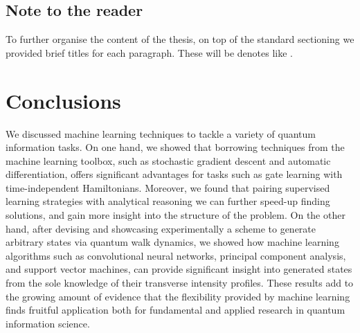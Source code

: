 \documentclass[12pt,twoside]{report}
\begin{document}
\section*{Note to the reader}
To further organise the content of the thesis, on top of the standard sectioning we provided brief titles for each paragraph. These will be denotes like .











\chapter{Conclusions}
We discussed machine learning techniques to tackle a variety of quantum information tasks.
On one hand, we showed that borrowing techniques from the machine learning toolbox, such as stochastic gradient descent and automatic differentiation, offers significant advantages for tasks such as gate learning with time-independent Hamiltonians.
Moreover, we found that pairing supervised learning strategies with analytical reasoning we can further speed-up finding solutions, and gain more insight into the structure of the problem.
On the other hand, after devising and showcasing experimentally a scheme to generate arbitrary states via quantum walk dynamics, we showed how machine learning algorithms such as convolutional neural networks, principal component analysis, and support vector machines, can provide significant insight into generated states from the sole knowledge of their transverse intensity profiles.
These results add to the growing amount of evidence that the flexibility provided by machine learning finds fruitful application both for fundamental and applied research in quantum information science.



\end{document}
